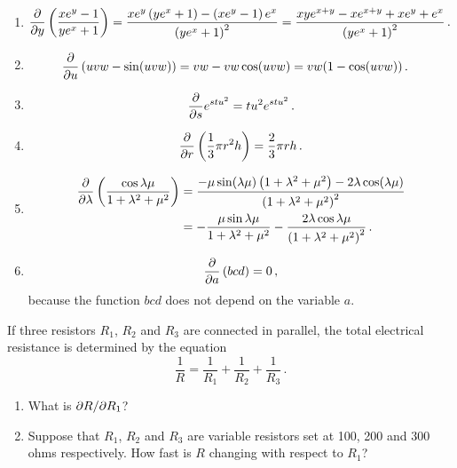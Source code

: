 \begin{solution}
\begin{enumerate}
\item
\begin{align*}
\frac{\partial}{\partial y}\left( \frac{x e^y - 1}{y e^x + 1} \right)
&= \frac{xe^y \left(y e^x + 1\right) - \left(xe^y - 1\right) e^x}
{\left( ye^x + 1\right)^2}
= \frac{xy e^{x+y}  - x e^{x+y} + xe^y + e^x}
{\left( ye^x + 1\right)^2}\,.
\end{align*}
\item
\begin{align*}
\frac{\partial}{\partial u} \left( uvw - \sin(uvw) \right)
&= vw - vw \cos(uvw) = vw( 1 - \cos(uvw))\,.
\end{align*}
\item
\[
\frac{\partial}{\partial s} e^{stu^2} = tu^2 e^{stu^2}\,.
\]
\item
\[
\frac{\partial}{\partial r}\left(\frac 13 \pi r^2 h\right) = \frac 23 \pi r h\,.
\]
\item
\begin{align*}
\frac{\partial}{\partial \lambda} \left( \frac{\cos \lambda\mu}{1+\lambda^2 + \mu^2} \right)
&= \frac{ - \mu \sin (\lambda \mu) \left( 1+ \lambda^2+\mu^2\right)
- 2\lambda \cos(\lambda \mu)}
{\left(1+\lambda^2+\mu^2\right)^2} \\
&=  -\frac{\mu \sin \lambda \mu}
{1+\lambda^2+\mu^2} - \frac{2\lambda \cos \lambda\mu}{\left(1+\lambda^2+\mu^2\right)^2}\,.
\end{align*}
\item
\[
\frac{\partial}{\partial a} \left( bcd \right) = 0\,,
\]
because the function $bcd$ does not depend on the variable $a$.
\end{enumerate}
\end{solution}

\begin{question}
If three resistors $R_1$, $R_2$ and $R_3$ are connected in parallel, the total electrical resistance is determined by the equation
\[
\frac{1}{R} = \frac{1}{R_1} + \frac{1}{R_2} + \frac{1}{R_3}\,.
\]
\begin{enumerate}
\item
What is $\partial R/\partial R_1$?
\item
Suppose that $R_1$, $R_2$ and $R_3$ are variable resistors set at 100, 200 and 300 ohms respectively. How fast is $R$ changing with respect to $R_1$?
\end{enumerate}
\end{question}

